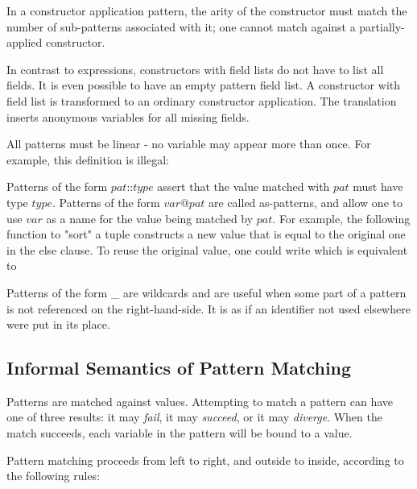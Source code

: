 In a constructor application pattern, the arity of the constructor must match the number of sub-patterns associated with it; one cannot match against a partially-applied constructor.

In contrast to expressions, constructors with field lists do not have to list all fields. It is even possible to have an empty pattern field list. A constructor with field list is transformed to an ordinary constructor application. The translation inserts anonymous variables for all missing fields.

All patterns must be linear - no variable may appear more than once. For example, this definition is illegal:

Patterns of the form $pat$::$type$ assert that the value matched with $pat$ must have type $type$.
Patterns of the form
$var$@$pat$
are called as-patterns, and allow one to use
$var$
as a name for the
value being matched by $pat$. For example, the following function to "sort" a tuple
constructs a new value that is equal to the original one in the else clause. To reuse the original value, one could write
which is equivalent to

Patterns of the form \_ are wildcards and are useful when some part of a pattern is not referenced on
the right-hand-side. It is as if an identifier not used elsewhere were put in its place.

\subsection{Informal Semantics of Pattern Matching} 

Patterns are matched against values. Attempting to match a pattern can have one of three results: it may \emph{fail}, it may \emph{succeed}, or it may \emph{diverge}.
When the match succeeds, each variable in the pattern will be bound to a value.

Pattern matching proceeds from left to right, and outside to inside, according to the following rules:

